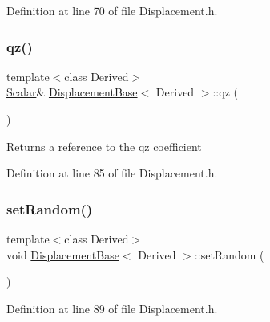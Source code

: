 Definition at line 70 of file Displacement.\+h.

\hypertarget{class_displacement_base_a93797b5c38b58ef40d7c67b4cef86251}{}\label{class_displacement_base_a93797b5c38b58ef40d7c67b4cef86251} 
\subsubsection{\texorpdfstring{qz()}{qz()}\hspace{0.1cm}{\footnotesize\ttfamily [2/2]}}
{\footnotesize\ttfamily template$<$class Derived$>$ \\
\hyperlink{class_displacement_base_a978caf313131fd9d221a856a2e4a80ad}{Scalar}\& \hyperlink{class_displacement_base}{Displacement\+Base}$<$ Derived $>$\+::qz (\begin{DoxyParamCaption}{ }\end{DoxyParamCaption})\hspace{0.3cm}{\ttfamily [inline]}}

\begin{DoxyReturn}{Returns}
a reference to the {\ttfamily qz} coefficient 
\end{DoxyReturn}


Definition at line 85 of file Displacement.\+h.

\hypertarget{class_displacement_base_a04542993e46456ee93c5767ad51cd1ba}{}\label{class_displacement_base_a04542993e46456ee93c5767ad51cd1ba} 
\subsubsection{\texorpdfstring{set\+Random()}{setRandom()}}
{\footnotesize\ttfamily template$<$class Derived$>$ \\
void \hyperlink{class_displacement_base}{Displacement\+Base}$<$ Derived $>$\+::set\+Random (\begin{DoxyParamCaption}{ }\end{DoxyParamCaption})\hspace{0.3cm}{\ttfamily [inline]}}



Definition at line 89 of file Displacement.\+h.

\hypertarget{class_displacement_base_a4e720f3f8dde2e04033ea120a0180ba1}{}\label{class_displacement_base_a4e720f3f8dde2e04033ea120a0180ba1} 
